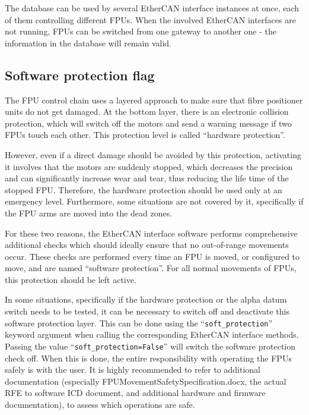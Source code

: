 \documentclass[11pt,a4paper]{report}
\begin{document}
The database can be used by several EtherCAN interface instances at once, each of
them controlling different FPUs. When the involved EtherCAN interfaces are not
running, FPUs can be switched from one gateway to another one - the
information in the database will remain valid.

\subsection{Software protection flag}
\label{sec:protectionintro}
The FPU control chain uses a layered approach to make sure that fibre
positioner units do not get damaged.  At the bottom layer, there is an
electronic collision protection, which will switch off the motors and
send a warning message if two FPUs touch each other. This protection
level is called ``hardware protection''.

 

However, even if a direct damage should be avoided by this protection,
activating it involves that the motors are suddenly stopped, which
decreases the precision and can significantly increase wear and tear,
thus reducing the life time of the stopped FPU. Therefore, the
hardware protection should be used only at an emergency
level. Furthermore, some situations are not covered by it,
specifically if the FPU arms are moved into the dead zones.

For these two reasons, the EtherCAN interface software performs comprehensive
additional checks which should ideally ensure that no out-of-range
movements occur. These checks are performed every time an FPU is
moved, or configured to move, and are named ``software protection''.
For all normal movements of FPUs, this protection should be left
active.

In some situations, specifically if the hardware protection or the
alpha datum switch needs to be tested, it can be necessary to switch
off and deactivate this software protection layer. This can be done
using the ``\texttt{soft\_protection}'' keyword argument when calling
the corresponding EtherCAN interface methods. Passing the value
``\texttt{soft\_protection=False}'' will switch the software
protection check off. When this is done, the entire responsibility
with operating the FPUs safely is with the user. It is highly
recommended to refer to additional documentation (especially
FPUMovementSafetySpecification.docx, the actual RFE to software ICD
document, and additional hardware and firmware documentation), to
assess which operations are safe.
\end{document}
